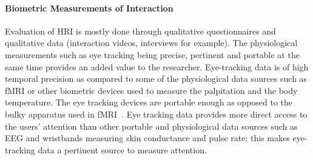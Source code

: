 \documentclass{sig-alternate}
\begin{document}
%
%
%
%


\paragraph{Biometric Measurements of Interaction}

Evaluation of HRI is mostly done through qualitative questionnaires and
qualitative data (interaction videos, interviews for example). The physiological
measurements such as eye tracking being precise, pertinent and portable at the
same time provides an added value to the researcher.  Eye-tracking data is of high temporal precision as compared to some of the physiological data sources such as fMRI or other
biometric devices used to measure the palpitation and the body temperature. The
eye tracking devices are portable enough as opposed to the bulky apparatus used
in fMRI~\cite{rosenthal2013neural}.  Eye tracking data provides more direct
access to the users' attention than other portable and physiological data
sources such as EEG and wristbands measuring skin conductance and pulse rate; this makes eye-tracking data a pertinent source to measure attention.
\end{document}
